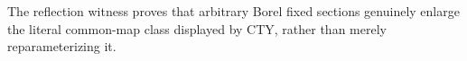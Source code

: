 The reflection witness proves that arbitrary Borel fixed sections genuinely enlarge the literal common-map class displayed by CTY, rather than merely reparameterizing it.
